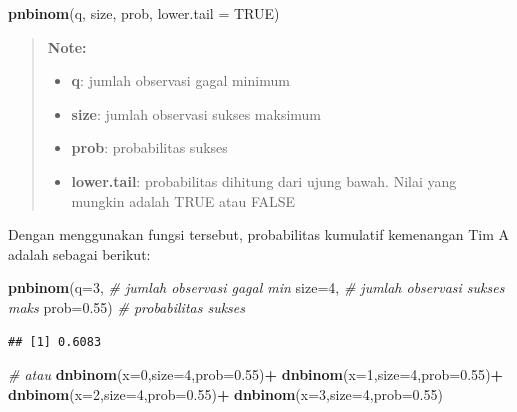 \documentclass[]{book}
\newenvironment{Shaded}{\begin{snugshade}}{\end{snugshade}}
\newcommand{\KeywordTok}[1]{\textcolor[rgb]{0.13,0.29,0.53}{\textbf{#1}}}
\newcommand{\DataTypeTok}[1]{\textcolor[rgb]{0.13,0.29,0.53}{#1}}
\newcommand{\DecValTok}[1]{\textcolor[rgb]{0.00,0.00,0.81}{#1}}
\newcommand{\FloatTok}[1]{\textcolor[rgb]{0.00,0.00,0.81}{#1}}
\newcommand{\StringTok}[1]{\textcolor[rgb]{0.31,0.60,0.02}{#1}}
\newcommand{\CommentTok}[1]{\textcolor[rgb]{0.56,0.35,0.01}{\textit{#1}}}
\newcommand{\OtherTok}[1]{\textcolor[rgb]{0.56,0.35,0.01}{#1}}
\newcommand{\OperatorTok}[1]{\textcolor[rgb]{0.81,0.36,0.00}{\textbf{#1}}}
\newcommand{\NormalTok}[1]{#1}
\providecommand{\tightlist}{%
  \setlength{\itemsep}{0pt}\setlength{\parskip}{0pt}}
\begin{document}
\begin{Shaded}
\begin{Highlighting}[]
\KeywordTok{pnbinom}\NormalTok{(q, size, prob, }\DataTypeTok{lower.tail =} \OtherTok{TRUE}\NormalTok{)}
\end{Highlighting}
\end{Shaded}

\begin{quote}
\textbf{Note: }

\begin{itemize}
\tightlist
\item
  \textbf{q}: jumlah observasi gagal minimum
\item
  \textbf{size}: jumlah observasi sukses maksimum
\item
  \textbf{prob}: probabilitas sukses
\item
  \textbf{lower.tail}: probabilitas dihitung dari ujung bawah. Nilai
  yang mungkin adalah TRUE atau FALSE
\end{itemize}
\end{quote}

Dengan menggunakan fungsi tersebut, probabilitas kumulatif kemenangan
Tim A adalah sebagai berikut:

\begin{Shaded}
\begin{Highlighting}[]
\KeywordTok{pnbinom}\NormalTok{(}\DataTypeTok{q=}\DecValTok{3}\NormalTok{, }\CommentTok{# jumlah observasi gagal min}
        \DataTypeTok{size=}\DecValTok{4}\NormalTok{, }\CommentTok{# jumlah observasi sukses maks}
        \DataTypeTok{prob=}\FloatTok{0.55}\NormalTok{) }\CommentTok{# probabilitas sukses}
\end{Highlighting}
\end{Shaded}

\begin{verbatim}
## [1] 0.6083
\end{verbatim}

\begin{Shaded}
\begin{Highlighting}[]
\CommentTok{# atau}
\KeywordTok{dnbinom}\NormalTok{(}\DataTypeTok{x=}\DecValTok{0}\NormalTok{,}\DataTypeTok{size=}\DecValTok{4}\NormalTok{,}\DataTypeTok{prob=}\FloatTok{0.55}\NormalTok{)}\OperatorTok{+}
\StringTok{  }\KeywordTok{dnbinom}\NormalTok{(}\DataTypeTok{x=}\DecValTok{1}\NormalTok{,}\DataTypeTok{size=}\DecValTok{4}\NormalTok{,}\DataTypeTok{prob=}\FloatTok{0.55}\NormalTok{)}\OperatorTok{+}
\StringTok{  }\KeywordTok{dnbinom}\NormalTok{(}\DataTypeTok{x=}\DecValTok{2}\NormalTok{,}\DataTypeTok{size=}\DecValTok{4}\NormalTok{,}\DataTypeTok{prob=}\FloatTok{0.55}\NormalTok{)}\OperatorTok{+}
\StringTok{  }\KeywordTok{dnbinom}\NormalTok{(}\DataTypeTok{x=}\DecValTok{3}\NormalTok{,}\DataTypeTok{size=}\DecValTok{4}\NormalTok{,}\DataTypeTok{prob=}\FloatTok{0.55}\NormalTok{)}
\end{Highlighting}
\end{Shaded}
\end{document}
